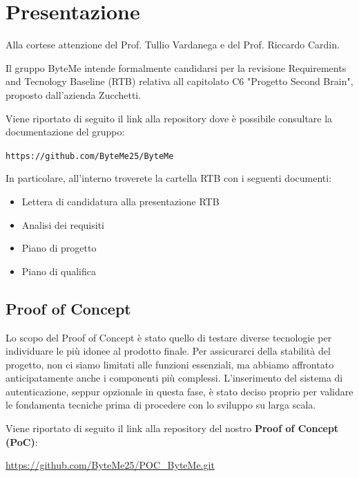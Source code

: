 \documentclass[11pt,a4paper]{article}
\begin{document}
\newpage

\tableofcontents
\thispagestyle{empty}
\newpage

\setcounter{page}{1}

\section{Presentazione}
Alla cortese attenzione del Prof. Tullio Vardanega e del Prof. Riccardo Cardin.

Il gruppo ByteMe intende formalmente candidarsi per la revisione Requirements and Tecnology Baseline (RTB) relativa all capitolato C6 "Progetto Second Brain", proposto dall'azienda Zucchetti.

Viene riportato di seguito il link alla repository dove è possibile consultare la documentazione del gruppo:
\begin{center}
\texttt{https://github.com/ByteMe25/ByteMe}
\end{center}

\noindent In particolare, all'interno troverete la cartella RTB con i seguenti documenti:
\begin{itemize}
    \item Lettera di candidatura alla presentazione RTB
    \item Analisi dei requisiti
    \item Piano di progetto
    \item Piano di qualifica
\end{itemize}


\subsection{Proof of Concept}
Lo scopo del Proof of Concept è stato quello di testare diverse tecnologie per individuare le più idonee al prodotto finale. Per assicurarci della stabilità del progetto, non ci siamo limitati alle funzioni essenziali, ma abbiamo affrontato anticipatamente anche i componenti più complessi. L'inserimento del sistema di autenticazione, seppur opzionale in questa fase, è stato deciso proprio per validare le fondamenta tecniche prima di procedere con lo sviluppo su larga scala.

Viene riportato di seguito il link alla repository del nostro \textbf{Proof of Concept (PoC)}:
\begin{center}
\url{https://github.com/ByteMe25/POC_ByteMe.git}
\end{center}
\end{document}
